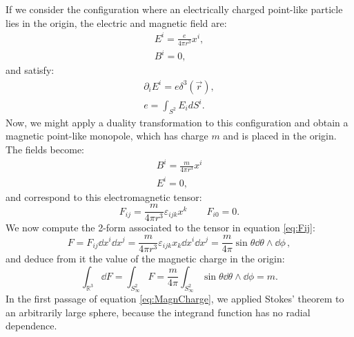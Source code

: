 \documentclass[main.tex]{subfiles}
\begin{document}
%
If we consider the configuration where an electrically charged point-like particle lies in the origin, the electric and magnetic field are:
\begin{subequations}\label{ElectricMonopole}
\begin{gather}
E^i=\frac{e}{4\pi r^3}x^i,\\
B^i =0,
\end{gather}
\end{subequations}
%
and satisfy:
%
\begin{subequations}
\begin{align}
\partial_i E^i= e \delta^3(\vec r),\\
e=\int_{S^2} E_i d S^i.
\end{align}
\end{subequations}
%
Now, we might apply a duality transformation to this configuration and obtain a magnetic point-like monopole, which has charge $m$ and is placed in the origin. The fields become:
%
\begin{subequations}
\begin{gather}
\label{MagneticMonopole}
B^i=\frac{m}{4\pi r^3}x^i\\
E^i=0,
\end{gather}
\end{subequations}
%
and correspond to this electromagnetic tensor:
\begin{equation}\label{eq:Fij}
F_{ij}=\frac{m}{4 \pi r^3}\varepsilon_{ijk}x^k \qquad F_{i0}=0.
\end{equation}
%
We now compute the 2-form associated to the tensor in equation \ref{eq:Fij}:
%
\begin{equation}
F=F_{ij}\dd{x^i}\dd{x^j}=\frac{m}{4\pi r^3}\varepsilon_{ijk}x_k\dd{x^i}\dd{x^j}=\frac{m}{4\pi}\sin\theta \dd{\theta}\wedge \dd{\phi}\,,
\end{equation}
%
and deduce from it the value of the magnetic charge in the origin:
%
\begin{equation} \label{eq:MagnCharge}
\int_{\mathbb R^3} \dd{F} = \int_{S^2_\infty} F=\frac{m}{4\pi}\int_{S^2_\infty}\sin\theta \dd{\theta}\wedge \dd{\phi}=m .
\end{equation}
%
In the first passage of equation \ref{eq:MagnCharge}, we applied Stokes' theorem to an arbitrarily large sphere, because the integrand function has no radial dependence.
\end{document}
